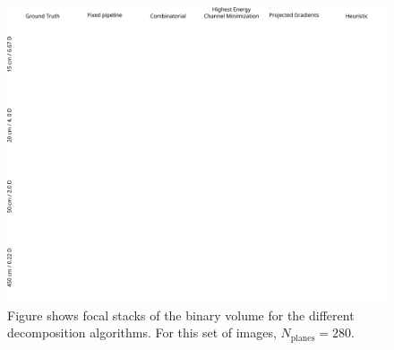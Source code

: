 \begin{figure}[!htb]
\centering
\includegraphics[width=0.99\columnwidth]{images/volumetric/acd_exp10/exp_FS}
\caption[Volumetric NED: Adaptive decomposition results: Focal stack for transparent objects and $N_{\text{planes}}=280$]{Figure shows focal stacks of the binary volume for the different decomposition algorithms. For this set of images, $N_{\text{planes}}=280.$}
\label{fig:volumetric:acd:exp10:focalstack}
\end{figure}

